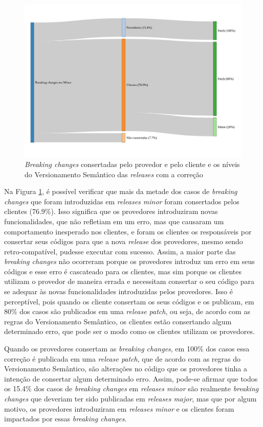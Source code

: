 \begin{figure}
    \centering
    \includegraphics[scale=0.5]{figuras/semver_fixed.pdf}
    \caption{\textit{Breaking changes} consertadas pelo provedor e pelo cliente e os níveis do Versionamento Semântico das \textit{releases} com a correção}
    \label{fig:semver_fixed}
\end{figure}{}

Na Figura \ref{fig:semver_fixed}, é possível verificar que mais da metade dos casos de \textit{breaking changes} que foram introduzidas em \textit{releases minor} foram consertados pelos clientes (76.9\%). Isso significa que os provedores introduziram novas funcionalidades, que não refletiam em um erro, mas que causaram um comportamento inesperado nos clientes, e foram os clientes os responsáveis por consertar seus códigos para que a nova \textit{release} dos provedores, mesmo sendo retro-compatível, pudesse executar com sucesso. Assim, a maior parte das \textit{breaking changes} não ocorreram porque os provedores introduz um erro em seus códigos e esse erro é cascateado para os clientes, mas sim porque os clientes utilizam o provedor de maneira errada e necessitam consertar o seu código para se adequar às novas funcionalidades introduzidas pelos provedores. Isso é perceptível, pois quando os cliente consertam os seus códigos e os publicam, em 80\% dos casos são publicados em uma \textit{release patch}, ou seja, de acordo com as regras do Versionamento Semântico, os clientes estão consertando algum determinado erro, que pode ser o modo como os clientes utilizam os provedores.

Quando os provedores consertam as \textit{breaking changes}, em 100\% dos casos essa correção é publicada em uma \textit{release patch}, que de acordo com as regras do Versionamento Semântico, são alterações no código que os provedores tinha a intenção de consertar algum determinado erro. Assim, pode-se afirmar que todos os 15.4\% dos casos de \textit{breaking changes} em \textit{releases minor} são realmente \textit{breaking changes} que deveriam ter sido publicadas em \textit{releases major}, mas que por algum motivo, os provedores introduziram em \textit{releases minor} e os clientes foram impactados por essas \textit{breaking changes}.

